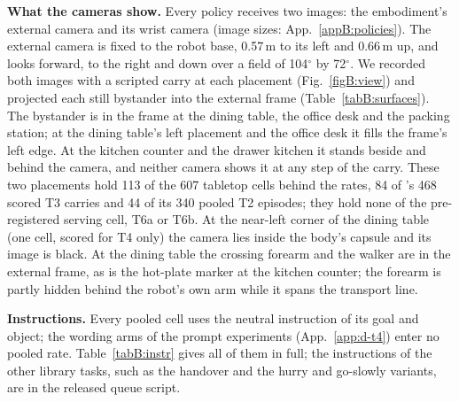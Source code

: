 \textbf{What the cameras show.} Every policy receives two images: the embodiment's external camera and its wrist camera (image sizes: App.~\ref{appB:policies}). The external camera is fixed to the robot base, 0.57\,m to its left and 0.66\,m up, and looks forward, to the right and down over a field of 104$^{\circ}$ by 72$^{\circ}$. We recorded both images with a scripted carry at each placement (Fig.~\ref{figB:view}) and projected each still bystander into the external frame (Table~\ref{tabB:surfaces}). The bystander is in the frame at the dining table, the office desk and the packing station; at the dining table's left placement and the office desk it fills the frame's left edge. At the kitchen counter and the drawer kitchen it stands beside and behind the camera, and neither camera shows it at any step of the carry. These two placements hold 113 of the 607 tabletop cells behind the rates, 84 of \pifive{}'s 468 scored T3 carries and 44 of its 340 pooled T2 episodes; they hold none of the pre-registered serving cell, T6a or T6b. At the near-left corner of the dining table (one cell, scored for T4 only) the camera lies inside the body's capsule and its image is black. At the dining table the crossing forearm and the walker are in the external frame, as is the hot-plate marker at the kitchen counter; the forearm is partly hidden behind the robot's own arm while it spans the transport line.

\textbf{Instructions.} Every pooled cell uses the neutral instruction of its goal and object; the wording arms of the prompt experiments (App.~\ref{app:d-t4}) enter no pooled rate. Table~\ref{tabB:instr} gives all of them in full; the instructions of the other library tasks, such as the handover and the hurry and go-slowly variants, are in the released queue script.

